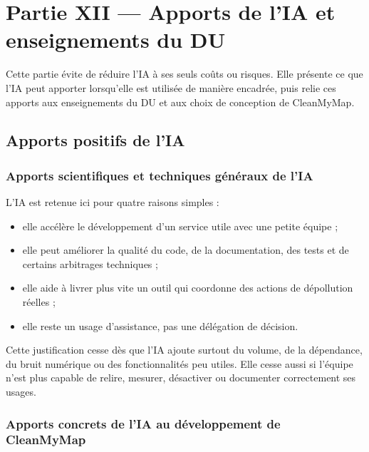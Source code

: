 \documentclass[
  10pt,
  a4paper,
  DIV=11,
  numbers=noendperiod,
  oneside]{scrreprt}
\providecommand{\tightlist}{%
  \setlength{\itemsep}{0pt}\setlength{\parskip}{0pt}}
\begin{document}
\chapter{Partie XII --- Apports de l'IA et enseignements du
DU}\label{partie-xii-apports-de-lia-et-enseignements-du-du}

Cette partie évite de réduire l'IA à ses seuls coûts ou risques. Elle
présente ce que l'IA peut apporter lorsqu'elle est utilisée de manière
encadrée, puis relie ces apports aux enseignements du DU et aux choix de
conception de CleanMyMap.

\section{Apports positifs de l'IA}\label{apports-positifs-de-lia}

\subsection{Apports scientifiques et techniques généraux de
l'IA}\label{apports-scientifiques-et-techniques-guxe9nuxe9raux-de-lia}

L'IA est retenue ici pour quatre raisons simples :

\begin{itemize}
\tightlist
\item
  elle accélère le développement d'un service utile avec une petite
  équipe ;
\item
  elle peut améliorer la qualité du code, de la documentation, des tests
  et de certains arbitrages techniques ;
\item
  elle aide à livrer plus vite un outil qui coordonne des actions de
  dépollution réelles ;
\item
  elle reste un usage d'assistance, pas une délégation de décision.
\end{itemize}

Cette justification cesse dès que l'IA ajoute surtout du volume, de la
dépendance, du bruit numérique ou des fonctionnalités peu utiles. Elle
cesse aussi si l'équipe n'est plus capable de relire, mesurer,
désactiver ou documenter correctement ses usages.

\subsection{Apports concrets de l'IA au développement de
CleanMyMap}\label{apports-concrets-de-lia-au-duxe9veloppement-de-cleanmymap}
\end{document}

